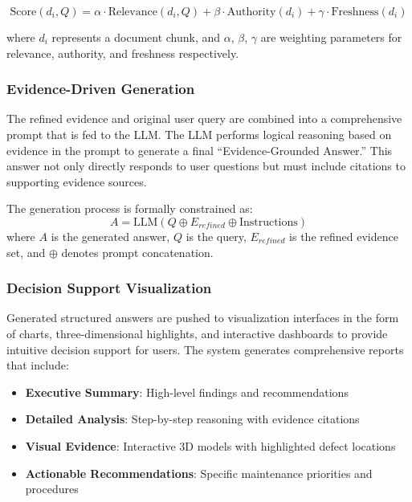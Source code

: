 \begin{equation}
\text{Score}(d_i, Q) = \alpha \cdot \text{Relevance}(d_i, Q) + \beta \cdot \text{Authority}(d_i) + \gamma \cdot \text{Freshness}(d_i)
\end{equation}

where $d_i$ represents a document chunk, and $\alpha$, $\beta$, $\gamma$ are weighting parameters for relevance, authority, and freshness respectively.

\subsubsection{Evidence-Driven Generation}

The refined evidence and original user query are combined into a comprehensive prompt that is fed to the LLM. The LLM performs logical reasoning based on evidence in the prompt to generate a final ``Evidence-Grounded Answer.'' This answer not only directly responds to user questions but must include citations to supporting evidence sources.

The generation process is formally constrained as:
\begin{equation}
A = \text{LLM}(Q \oplus E_{refined} \oplus \text{Instructions})
\end{equation}
where $A$ is the generated answer, $Q$ is the query, $E_{refined}$ is the refined evidence set, and $\oplus$ denotes prompt concatenation.

\subsubsection{Decision Support Visualization}

Generated structured answers are pushed to visualization interfaces in the form of charts, three-dimensional highlights, and interactive dashboards to provide intuitive decision support for users. The system generates comprehensive reports that include:

\begin{itemize}
\item \textbf{Executive Summary}: High-level findings and recommendations
\item \textbf{Detailed Analysis}: Step-by-step reasoning with evidence citations
\item \textbf{Visual Evidence}: Interactive 3D models with highlighted defect locations
\item \textbf{Actionable Recommendations}: Specific maintenance priorities and procedures
\end{itemize}

